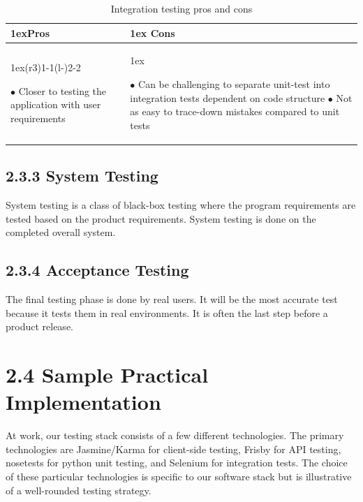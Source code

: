\documentclass[12pt]{report}
\begin{document}
\begin{table}[ht]
\begin{tabularx}{\linewidth}{>{\parskip1ex}X@{\kern4\tabcolsep}>{\parskip1ex}X}
\toprule
\hfil\bfseries Pros & \hfil\bfseries Cons
\\\cmidrule(r{3\tabcolsep}){1-1}\cmidrule(l{-\tabcolsep}){2-2}

$\bullet$ Closer to testing the application with user requirements 

&

$\bullet$ Can be challenging to separate unit-test into integration tests    dependent on code structure
$\bullet$ Not as easy to trace-down mistakes compared to unit tests

\\\bottomrule
\end{tabularx}
\caption{Integration testing pros and cons}
\end{table}

\subsection*{2.3.3 System Testing}
\par\noindent
System testing is a class of black-box testing where the program requirements are tested based on the product requirements. System testing is done on the completed overall system.

\subsection*{2.3.4 Acceptance Testing}
\par\noindent
The final testing phase is done by real users. It will be the most accurate test because it tests them in real environments. It is often the last step before a product release.


\section*{2.4 Sample Practical Implementation}
\par\noindent
At work, our testing stack consists of a few different technologies. The primary technologies are Jasmine/Karma for client-side testing, Frisby for API testing, nosetests for python unit testing, and Selenium for integration tests. The choice of these particular technologies is specific to our software stack but is illustrative of a well-rounded testing strategy.
\end{document}
